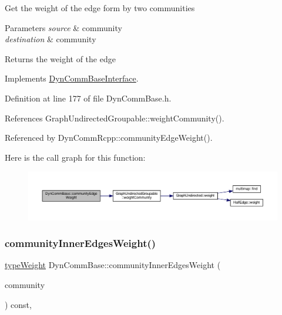 Get the weight of the edge form by two communities


\begin{DoxyParams}{Parameters}
{\em source} & community \\
\hline
{\em destination} & community \\
\hline
\end{DoxyParams}
\begin{DoxyReturn}{Returns}
the weight of the edge 
\end{DoxyReturn}


Implements \hyperlink{classDynCommBaseInterface_a17c322600ba39050005153845dfd3021}{Dyn\+Comm\+Base\+Interface}.



Definition at line 177 of file Dyn\+Comm\+Base.\+h.



References Graph\+Undirected\+Groupable\+::weight\+Community().



Referenced by Dyn\+Comm\+Rcpp\+::community\+Edge\+Weight().

Here is the call graph for this function\+:
\nopagebreak
\begin{figure}[H]
\begin{center}
\leavevmode
\includegraphics[width=350pt]{classDynCommBase_a1ef408ec71d82b008fc0229416c77b61_cgraph}
\end{center}
\end{figure}
\mbox{\label{classDynCommBase_ada91e7e914eb8be7f8c25f4c0c81156a}} 
\subsubsection{\texorpdfstring{community\+Inner\+Edges\+Weight()}{communityInnerEdgesWeight()}}
{\footnotesize\ttfamily \hyperlink{edge_8h_a2e7ea3be891ac8b52f749ec73fee6dd2}{type\+Weight} Dyn\+Comm\+Base\+::community\+Inner\+Edges\+Weight (\begin{DoxyParamCaption}\item[{\hyperlink{graphUndirectedGroupable_8h_a914da95c9ea7f14f4b7f875c36818556}{type\+Community}}]{community }\end{DoxyParamCaption}) const\hspace{0.3cm}{\ttfamily [inline]}, {\ttfamily [virtual]}}

